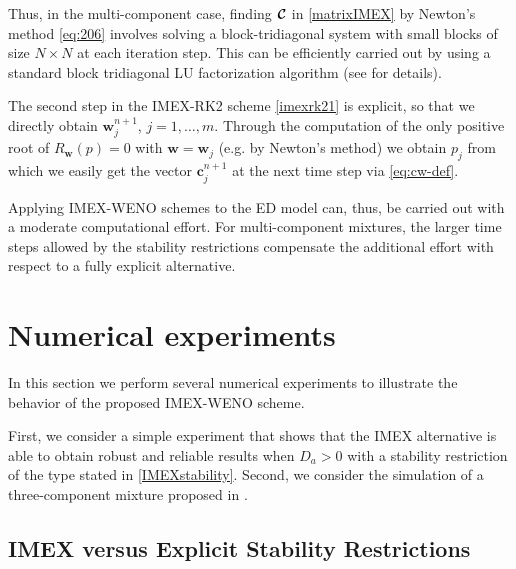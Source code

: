 \documentclass[preprint]{elsarticle}
\theoremstyle{definition}
\newcommand{\bw}{\boldsymbol w}
\newcommand{\clC}{{\boc{C}}}
\def\boc#1{\boldsymbol{{\cal #1}}}
\begin{document}
Thus, in the multi-component case, finding $\clC$ in
\eqref{matrixIMEX} by Newton's method \eqref{eq:206}
involves solving a 
block-tridiagonal system with small
blocks of size $N \times N$ at each iteration step. This can be
efficiently carried out by using a standard block tridiagonal LU
factorization algorithm (see \cite{Golub} for details). 




The second step in the  IMEX-RK2 scheme \eqref{imexrk21} is
explicit, so that we directly obtain ${\boldsymbol w}_j^{n+1}$,
$j=1,\ldots,m$.  Through the computation of the only positive root
of  $R_{\bw}(p)=0$ with $\bw=\bw_j$ (e.g. by Newton's
method) we  obtain $p_j$ from which we easily get
the vector $\boldsymbol{c}_j^{n+1}$ at the next time step via
\eqref{eq:cw-def}.






Applying IMEX-WENO schemes to the ED model can, thus, be carried out
with a moderate computational effort. For multi-component mixtures,
the larger time steps allowed by the stability restrictions compensate
the additional effort with respect to a fully explicit alternative. 






 
\section{Numerical experiments} \label{sec:numex}
In this section we perform several numerical experiments to
illustrate the behavior of the proposed IMEX-WENO scheme.

First, we consider a simple experiment that shows that the IMEX
alternative is able to obtain robust and reliable results when $D_a>0$
with a stability restriction of the type stated in
\eqref{IMEXstability}. Second, we consider the simulation of a
three-component mixture proposed in \cite{Javeed}.


%


\subsection{IMEX  versus Explicit Stability Restrictions}
\end{document}
